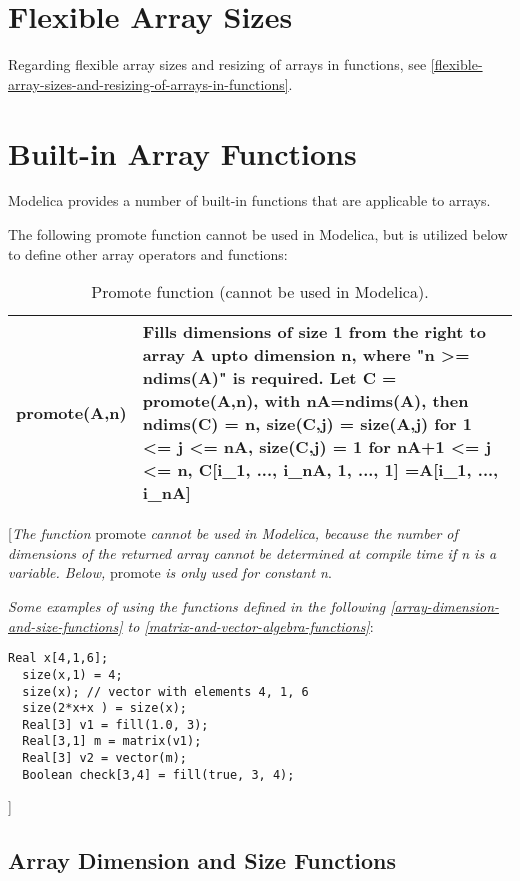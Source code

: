 \section{Flexible Array Sizes}

Regarding flexible array sizes and resizing of arrays in functions, see
\ref{flexible-array-sizes-and-resizing-of-arrays-in-functions}.

\section{Built-in Array Functions}

Modelica provides a number of built-in functions that are applicable to
arrays.

The following promote function cannot be used in Modelica, but is
utilized below to define other array operators and functions:

\begin{longtable}[]{|l|p{9cm}|}
\caption{Promote function (cannot be used in Modelica).}\\
\hline \endhead
promote(A,n) & Fills dimensions of size 1 from the right to array A upto
dimension n, where "n \textgreater{}= ndims(A)" is required. Let C =
promote(A,n), with nA=ndims(A), then ndims(C) = n, size(C,j) = size(A,j)
for 1 \textless{}= j \textless{}= nA, size(C,j) = 1 for nA+1 <= j <= n, C{[}i\_1, ..., i\_nA, 1, ..., 1{]} =A{[}i\_1, ..., i\_nA{]}\\ \hline
\end{longtable}

{[}\emph{The function} promote \emph{cannot be used in Modelica, because
the number of dimensions of the returned array cannot be determined at
compile time if n is a variable. Below,} promote \emph{is only used for
constant n}.

\emph{Some examples of using the functions defined in the following
\ref{array-dimension-and-size-functions} to \ref{matrix-and-vector-algebra-functions}}:

\begin{lstlisting}[language=modelica]
  Real x[4,1,6];
  size(x,1) = 4;
  size(x); // vector with elements 4, 1, 6
  size(2*x+x ) = size(x);
  Real[3] v1 = fill(1.0, 3);
  Real[3,1] m = matrix(v1);
  Real[3] v2 = vector(m);
  Boolean check[3,4] = fill(true, 3, 4);
\end{lstlisting}
{]}

\subsection{Array Dimension and Size Functions}


